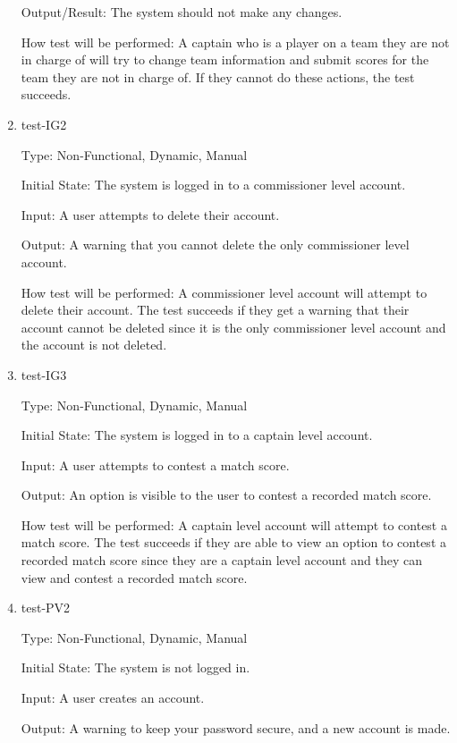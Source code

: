 \documentclass[12pt, titlepage]{article}
\begin{document}
\begin{enumerate}
  Output/Result: The system should not make any changes.
            
  How test will be performed: A captain who is a player on a team they are not
  in charge of will try to change team information and submit scores for the
  team they are not in charge of. If they cannot do these actions, the test
  succeeds.

  \item{test-IG2\\}

  Type: Non-Functional, Dynamic, Manual

  Initial State: The system is logged in to a commissioner level account.

  Input: A user attempts to delete their account.

  Output: A warning that you cannot delete the only commissioner level
  account.

  How test will be performed: A commissioner level account will attempt to
  delete their account. The test succeeds if they get a warning that their
  account cannot be deleted since it is the only commissioner level account
  and the account is not deleted.

  \item{test-IG3\\}

  Type: Non-Functional, Dynamic, Manual

  Initial State: The system is logged in to a captain level account.

  Input: A user attempts to contest a match score.

  Output: An option is visible to the user to contest a recorded match score.

  How test will be performed: A captain level account will attempt to
  contest a match score. The test succeeds if they are able to view an option to contest
  a recorded match score since they are a captain level account and they can view and contest
  a recorded match score.

  \item{test-PV2\\}

  Type: Non-Functional, Dynamic, Manual

  Initial State: The system is not logged in.

  Input: A user creates an account.

  Output: A warning to keep your password secure, and a new account is made.


\end{enumerate}
\end{document}

